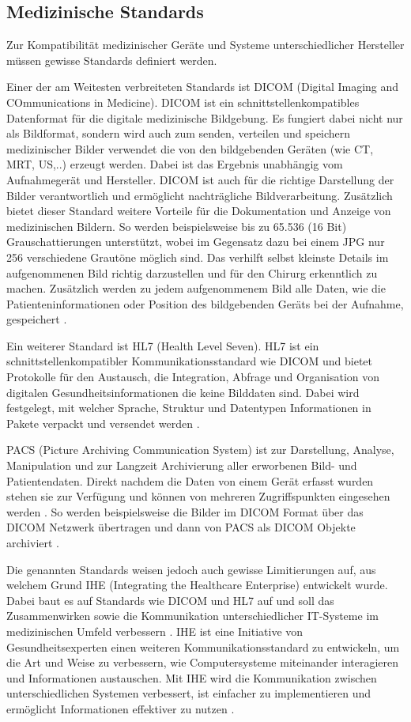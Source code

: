 \subsection{Medizinische Standards}

Zur Kompatibilität medizinischer Geräte und Systeme unterschiedlicher Hersteller müssen gewisse Standards definiert werden.

Einer der am Weitesten verbreiteten Standards ist DICOM (Digital Imaging and COmmunications in Medicine). DICOM ist ein schnittstellenkompatibles Datenformat für die digitale medizinische Bildgebung. Es fungiert dabei nicht nur als Bildformat, sondern wird auch zum senden, verteilen und speichern medizinischer Bilder verwendet die von den bildgebenden Geräten (wie CT, MRT, US,..) erzeugt werden. Dabei ist das Ergebnis unabhängig vom Aufnahmegerät und Hersteller. DICOM ist auch für die richtige Darstellung der Bilder verantwortlich und ermöglicht nachträgliche Bildverarbeitung.
Zusätzlich bietet dieser Standard weitere Vorteile für die Dokumentation und Anzeige von medizinischen Bildern. So werden beispielsweise bis zu 65.536 (16 Bit) Grauschattierungen unterstützt, wobei im Gegensatz dazu bei einem JPG nur 256 verschiedene Grautöne möglich sind. Das verhilft selbst kleinste Details im aufgenommenen Bild richtig darzustellen und für den Chirurg erkenntlich zu machen. Zusätzlich werden zu jedem aufgenommenem Bild alle Daten, wie die Patienteninformationen oder Position des bildgebenden Geräts bei der Aufnahme, gespeichert \cite{DICOM}.

Ein weiterer Standard ist HL7 (Health Level Seven). HL7 ist ein schnittstellenkompatibler Kommunikationsstandard wie DICOM \cite{DerDigitaleOperationssaal} und bietet Protokolle für den Austausch, die Integration, Abfrage und Organisation von digitalen Gesundheitsinformationen die keine Bilddaten sind. Dabei wird festgelegt, mit welcher Sprache, Struktur und Datentypen Informationen in Pakete verpackt und versendet werden \cite{HL7}.

PACS (Picture Archiving Communication System) ist zur Darstellung, Analyse, Manipulation und zur Langzeit Archivierung aller erworbenen Bild- und Patientendaten. Direkt nachdem die Daten von einem Gerät erfasst wurden stehen sie zur Verfügung und können von mehreren Zugriffspunkten eingesehen werden \cite{PACS}.
So werden beispielsweise die Bilder im DICOM Format über das DICOM Netzwerk übertragen und dann von PACS als DICOM Objekte archiviert \cite{DICOM}.

Die genannten Standards weisen jedoch auch gewisse Limitierungen auf, aus welchem Grund IHE (Integrating the Healthcare Enterprise) entwickelt wurde. Dabei baut es auf Standards wie DICOM und HL7 auf und soll das Zusammenwirken sowie die Kommunikation unterschiedlicher IT-Systeme im medizinischen Umfeld verbessern \cite{DICOMundIHE}. 
IHE ist eine Initiative von Gesundheitsexperten einen weiteren Kommunikationsstandard zu entwickeln, um die Art und Weise zu verbessern, wie Computersysteme miteinander interagieren und Informationen austauschen. Mit IHE wird die Kommunikation zwischen unterschiedlichen Systemen verbessert, ist einfacher zu implementieren und ermöglicht Informationen effektiver zu nutzen \cite{IHE}.

